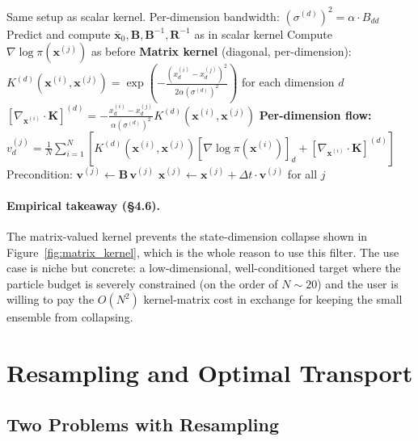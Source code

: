 \documentclass{article}
\begin{document}
\begin{algorithm}[H]
\caption{Kernel Flow Filter --- Matrix (Tensor) Kernel}
\begin{algorithmic}[1]
\REQUIRE Same setup as scalar kernel. Per-dimension bandwidth: $(\sigma^{(d)})^2 = \alpha \cdot B_{dd}$
  \STATE Predict and compute $\bar{\mathbf{x}}_0, \mathbf{B}, \mathbf{B}^{-1}, \mathbf{R}^{-1}$ as in scalar kernel
      \STATE Compute $\nabla \log \pi(\mathbf{x}^{(j)})$ as before
      \STATE \textbf{Matrix kernel} (diagonal, per-dimension):
      \STATE $K^{(d)}(\mathbf{x}^{(i)}, \mathbf{x}^{(j)}) = \exp\!\left(-\frac{(x_d^{(i)}-x_d^{(j)})^2}{2\alpha (\sigma^{(d)})^2}\right)$ for each dimension $d$
      \STATE $[\nabla_{\mathbf{x}^{(i)}} \cdot \mathbf{K}]^{(d)} = -\frac{x_d^{(i)}-x_d^{(j)}}{\alpha (\sigma^{(d)})^2} K^{(d)}(\mathbf{x}^{(i)}, \mathbf{x}^{(j)})$
      \STATE \textbf{Per-dimension flow:}
      \STATE $v_d^{(j)} = \frac{1}{N}\sum_{i=1}^{N}\left[K^{(d)}(\mathbf{x}^{(i)}, \mathbf{x}^{(j)})[\nabla \log\pi(\mathbf{x}^{(i)})]_d + [\nabla_{\mathbf{x}^{(i)}} \cdot \mathbf{K}]^{(d)}\right]$
    \ENDFOR
    \STATE Precondition: $\mathbf{v}^{(j)} \leftarrow \mathbf{B}\, \mathbf{v}^{(j)}$
    \STATE $\mathbf{x}^{(j)} \leftarrow \mathbf{x}^{(j)} + \Delta t \cdot \mathbf{v}^{(j)}$ for all $j$
  \ENDFOR
\ENDFOR
\end{algorithmic}
\end{algorithm}

\paragraph{Empirical takeaway (§4.6).} The matrix-valued kernel prevents the state-dimension collapse shown in Figure~\ref{fig:matrix_kernel}, which is the whole reason to use this filter. The use case is niche but concrete: a low-dimensional, well-conditioned target where the particle budget is severely constrained (on the order of $N \sim 20$) and the user is willing to pay the $O(N^2)$ kernel-matrix cost in exchange for keeping the small ensemble from collapsing.

\newpage

\newpage
\section{Resampling and Optimal Transport}

\subsection{Two Problems with Resampling}
\end{document}
